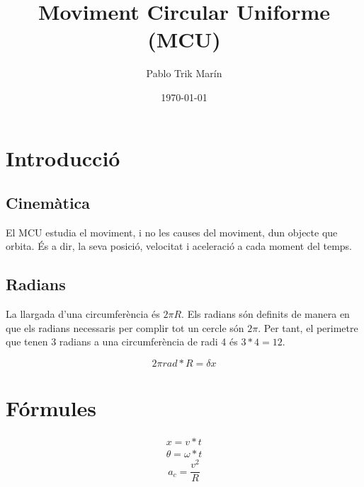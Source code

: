 \documentclass[12pt]{report}
\begin{document}
\title{Moviment Circular Uniforme (MCU)}
\author{Pablo Trik Marín}
\date{\today}
\maketitle

\tableofcontents


\chapter{Introducció}
\section{Cinemàtica}

El MCU estudia el moviment, i no les causes del moviment, dun objecte que orbita. És a dir, la seva posició, velocitat i aceleració a cada moment del temps.

\section{Radians}

La llargada d'una circumferència és \(2\pi R\). Els radians són definits de manera en que els radians necessaris per complir tot un cercle són \(2\pi\). Per tant, el perimetre que tenen 3 radians a una circumferència de radi 4 és \(3*4 = 12\).

\begin{equation}
	2\pi rad * R = \delta x 
\end{equation}


\chapter{Fórmules}
\begin{align}
	x = v*t \\ \theta = \omega*t 
\end{align}
\begin{equation}
	a_c = \frac{v^2}{R} 
\end{equation}
\end{document}
